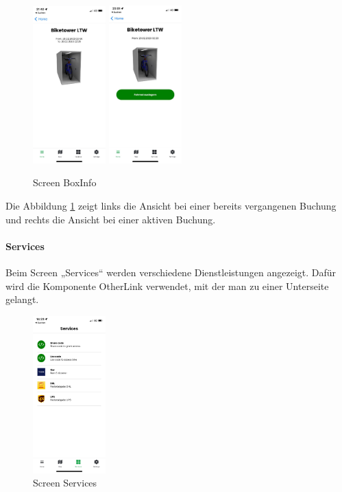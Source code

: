 \begin{figure}[H]
  \centering
  \includegraphics[width=0.25\textwidth]{images/app-screenshots/screenboxinfo.png}
  \includegraphics[width=0.25\textwidth]{images/app-screenshots/screenboxinfov.png}
  \caption{Screen BoxInfo}
  \label{fig:screenboxinfo}
\end{figure}
Die Abbildung \ref{fig:screenboxinfo} zeigt links die Ansicht bei einer bereits vergangenen Buchung und rechts die Ansicht bei einer aktiven Buchung.

\bigskip


\paragraph{Services}Beim Screen „Services“ werden verschiedene Dienstleistungen angezeigt. Dafür wird die Komponente OtherLink verwendet, mit der man zu einer Unterseite gelangt.

\begin{figure}[H]
  \centering
  \includegraphics[width=0.25\textwidth]{images/app-screenshots/screenservices.png}
  \caption{Screen Services}
  \label{fig:screenservices}
\end{figure}

